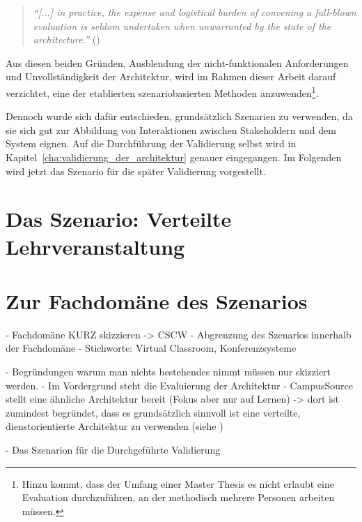   \begin{quote}
    \emph{"`[...] in practice, the expense and logistical burden of convening a full-blown evaluation is seldom undertaken when unwarranted by the state of the architecture."'} (\citep[S. 24]{evaluating_software_architectures})
  \end{quote}
  
  Aus diesen beiden Gründen, Ausblendung der nicht-funktionalen Anforderungen und Unvollständigkeit der Architektur, wird im Rahmen dieser Arbeit darauf verzichtet, eine der etablierten szenariobasierten Methoden anzuwenden\footnote{Hinzu kommt, dass der Umfang einer Master Thesis es nicht erlaubt eine Evaluation durchzuführen, an der methodisch mehrere Personen arbeiten müssen.}. 
  
  Dennoch wurde sich dafür entschieden, grundsätzlich Szenarien zu verwenden, da sie sich gut zur Abbildung von Interaktionen zwischen Stakeholdern und dem System eignen. Auf die Durchführung der Validierung selbst wird in Kapitel~\ref{cha:validierung_der_architektur} genauer eingegangen. Im Folgenden wird jetzt das Szenario für die später Validierung vorgestellt.
  

\section{Das Szenario: Verteilte Lehrveranstaltung} %
\label{sec:hochschulszenario}

\section{Zur Fachdomäne des Szenarios} %
\label{sec:zur_fachdomaene_des_szenarios}

- Fachdomäne KURZ skizzieren -> CSCW
- Abgrenzung des Szenarios innerhalb der Fachdomäne
- Stichworte: Virtual Classroom, Konferenzsysteme

- Begründungen warum man nichts bestehendes nimmt müssen nur skizziert werden.
  - Im Vordergrund steht die Evaluierung der Architektur
  - CampusSource stellt eine ähnliche Architektur bereit (Fokus aber nur auf Lernen) -> dort ist zumindest begründet, dass es grundsätzlich sinnvoll ist eine verteilte, dienstorientierte Architektur zu verwenden (siehe \citep{campus_source})


  - Das Szenarion für die Durchgeführte Validierung


